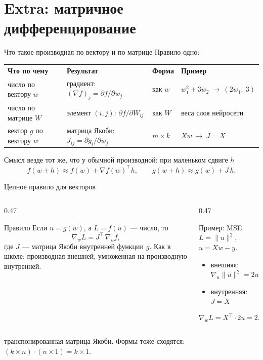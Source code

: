 \section{Extra: матричное дифференцирование}

\begin{frame}[c]{Что такое производная по вектору и по матрице}
  \small Правило одно: 

  \medskip
  \small\setlength{\tabcolsep}{4pt}
  \begin{tabular}{llll}
    \textbf{Что по чему} & \textbf{Результат} & \textbf{Форма} & \textbf{Пример}\\
    число по вектору $w$ & градиент: $(\nabla f)_j = \partial f/\partial w_j$ & как $w$ & $w_1^2 + 3w_2 \ \to\ (2w_1;\ 3)$\\
    число по матрице $W$ & элемент $(i,j)$: $\partial f/\partial W_{ij}$ & как $W$ & веса слоя нейросети\\
    вектор $g$ по вектору $w$ & матрица Якоби: $J_{ij} = \partial g_i/\partial w_j$ & $m\times k$ & $Xw \ \to\ J = X$\\
  \end{tabular}

  \medskip
  \raggedright
  Смысл везде тот же, что у обычной производной: при маленьком сдвиге $h$
  \[f(w + h) \approx f(w) + \nabla f(w)^\top h, \qquad g(w + h) \approx g(w) + J\,h.\]
\end{frame}

\begin{frame}[c]{Цепное правило для векторов}
  \begin{columns}[T]
    \begin{column}{0.47\textwidth}
      \begin{block}{Правило}
        \small
        Если $u = g(w)$, а $L = f(u)$ --- число, то
        \[\nabla_w L = J^\top\,\nabla_u f,\]
        где $J$ --- матрица Якоби внутренней функции $g$.
        Как в школе: производная внешней, умноженная на производную внутренней.
      \end{block}
    \end{column}
    \begin{column}{0.47\textwidth}
      \begin{block}{Пример: MSE}
        \small
        $L = \lVert u\rVert^2$, \ $u = Xw - y$.
        \begin{itemize}
          \item внешняя: $\nabla_u \lVert u\rVert^2 = 2u$
          \item внутренняя: $J = X$
        \end{itemize}
        \[\nabla_w L = X^\top\cdot 2u = 2X^\top(Xw - y)\]
      \end{block}
    \end{column}
  \end{columns}

  \medskip
   транспонированная матрица Якоби. Формы тоже сходятся:
  $(k\times n)\cdot(n\times 1) = k\times 1$.
\end{frame}

